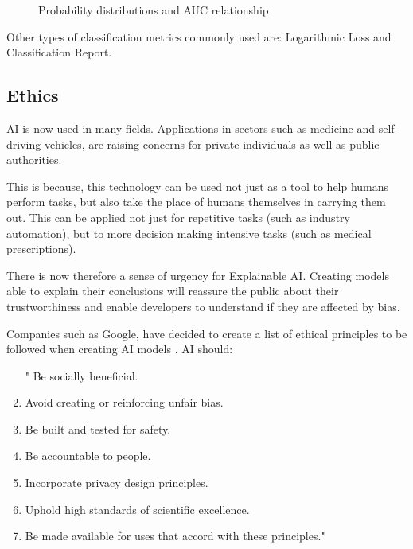 \begin{figure}[ht!]%
    \centering
    \qquad
    \caption{Probability distributions and AUC relationship}%
    \label{fig:example2}%
\end{figure}

Other types of classification metrics commonly used are: Logarithmic Loss and Classification Report.

\subsection{Ethics}
AI is now used in many fields. Applications in sectors such as medicine and self-driving vehicles, are raising concerns for private individuals as well as public authorities. 

This is because, this technology can be used not just as a tool to help humans perform tasks, but also take the place of humans themselves in carrying them out. This can be applied not just for repetitive tasks (such as industry automation), but to more decision making intensive tasks (such as medical prescriptions).

There is now therefore a sense of urgency for Explainable AI.  Creating models able to explain their conclusions will reassure the public about their trustworthiness and enable developers to understand if they are affected by bias. 

Companies such as Google, have decided to create a list of ethical principles to be followed when creating AI models \cite{Google}. AI should:
\begin{enumerate}
\itemsep0em
\item["\refstepcounter{enumi}\labelenumi] Be socially beneficial.
\item Avoid creating or reinforcing unfair bias.
\item Be built and tested for safety.
\item Be accountable to people.
\item Incorporate privacy design principles.
\item Uphold high standards of scientific excellence.
\item Be made available for uses that accord with these principles."
\end{enumerate}